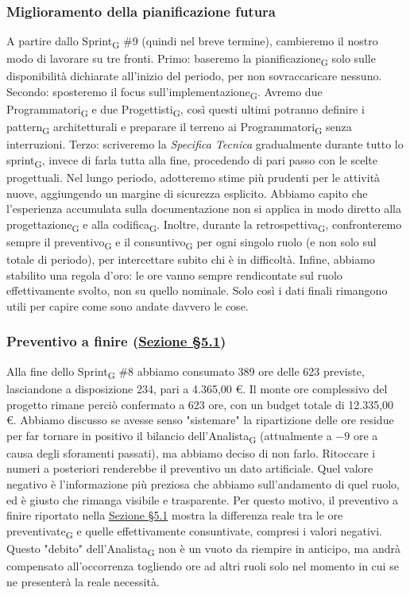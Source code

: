 ﻿\documentclass[a4paper, 10pt, colorlinks=true, linkcolor=black, urlcolor=blue, citecolor=blue, hidelinks]{article}
\begin{document}
\subsubsection{Miglioramento della pianificazione futura}
A partire dallo Sprint\textsubscript{G} \#9 (quindi nel breve termine), cambieremo il nostro modo di lavorare su tre fronti. Primo: baseremo la pianificazione\textsubscript{G} solo sulle disponibilità dichiarate all'inizio del periodo, per non sovraccaricare nessuno. Secondo: sposteremo il focus sull'implementazione\textsubscript{G}. Avremo due Programmatori\textsubscript{G} e due Progettisti\textsubscript{G}, così questi ultimi potranno definire i pattern\textsubscript{G} architetturali e preparare il terreno ai Programmatori\textsubscript{G} senza interruzioni. Terzo: scriveremo la \textit{Specifica Tecnica} gradualmente durante tutto lo sprint\textsubscript{G}, invece di farla tutta alla fine, procedendo di pari passo con le scelte progettuali.
Nel lungo periodo, adotteremo stime più prudenti per le attività nuove, aggiungendo un margine di sicurezza esplicito. Abbiamo capito che l'esperienza accumulata sulla documentazione non si applica in modo diretto alla progettazione\textsubscript{G} e alla codifica\textsubscript{G}. Inoltre, durante la retrospettiva\textsubscript{G}, confronteremo sempre il preventivo\textsubscript{G} e il consuntivo\textsubscript{G} per ogni singolo ruolo (e non solo sul totale di periodo), per intercettare subito chi è in difficoltà. Infine, abbiamo stabilito una regola d'oro: le ore vanno sempre rendicontate sul ruolo effettivamente svolto, non su quello nominale. Solo così i dati finali rimangono utili per capire come sono andate davvero le cose.

\subsubsection{Preventivo a finire (\hyperref[tab:preventivo-finire]{Sezione \S5.1})}
Alla fine dello Sprint\textsubscript{G} \#8 abbiamo consumato 389 ore delle 623 previste, lasciandone a disposizione 234, pari a 4.365,00 €. Il monte ore complessivo del progetto rimane perciò confermato a 623 ore, con un budget totale di 12.335,00 €.
Abbiamo discusso se avesse senso "sistemare" la ripartizione delle ore residue per far tornare in positivo il bilancio dell'Analista\textsubscript{G} (attualmente a $-9$ ore a causa degli sforamenti passati), ma abbiamo deciso di non farlo. Ritoccare i numeri a posteriori renderebbe il preventivo un dato artificiale. Quel valore negativo è l'informazione più preziosa che abbiamo sull'andamento di quel ruolo, ed è giusto che rimanga visibile e trasparente.
Per questo motivo, il preventivo a finire riportato nella \hyperref[tab:preventivo-finire]{Sezione \S5.1} mostra la differenza reale tra le ore preventivate\textsubscript{G} e quelle effettivamente consuntivate, compresi i valori negativi. Questo "debito" dell'Analista\textsubscript{G} non è un vuoto da riempire in anticipo, ma andrà compensato all'occorrenza togliendo ore ad altri ruoli solo nel momento in cui se ne presenterà la reale necessità.
\end{document}
